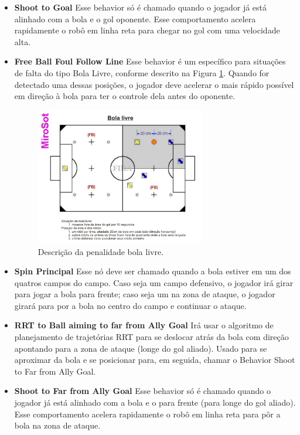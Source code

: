 \documentclass[conference]{IEEEtran}
\begin{document}
\begin{itemize}
\item \textbf{Shoot to Goal} Esse behavior só é chamado quando o jogador já está alinhado com a bola e o gol oponente. Esse comportamento acelera rapidamente o robô em linha reta para chegar no gol com uma velocidade alta.

\item \textbf{Free Ball Foul Follow Line} Esse behavior é um específico para situações de falta do tipo Bola Livre, conforme descrito na Figura \ref{fig:bola_livre}. Quando for detectado uma dessas posições, o jogador deve acelerar o mais rápido possível em direção à bola para ter o controle dela antes do oponente.

\begin{figure}[H]
	\centering
	\includegraphics[width=0.7\textwidth]{figures/bola_livre.png}
   \caption{Descrição da penalidade bola livre.} \label{fig:bola_livre}
\end{figure}

\item \textbf{Spin Principal} Esse nó deve ser chamado quando a bola estiver em um dos quatros campos do campo. Caso seja um campo defensivo, o jogador irá girar para jogar a bola para frente; caso seja um na zona de ataque, o jogador girará para por a bola no centro do campo e continuar o ataque.

\item \textbf{RRT to Ball aiming to far from Ally Goal} Irá usar o algoritmo de planejamento de trajetórias RRT para se deslocar atrás da bola com direção apontando para a zona de ataque (longe do gol aliado). Usado para se aproximar da bola e se posicionar para, em seguida, chamar o Behavior Shoot to Far from Ally Goal.

\item \textbf{Shoot to Far from Ally Goal} Esse behavior só é chamado quando o jogador já está alinhado com a bola e o para frente (para longe do gol aliado). Esse comportamento acelera rapidamente o robô em linha reta para pôr a bola na zona de ataque.

\end{itemize}
\end{document}
